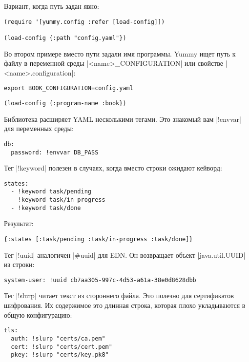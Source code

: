 Вариант, когда путь задан явно:

\begin{verbatim}
(require '[yummy.config :refer [load-config]])

(load-config {:path "config.yaml"})
\end{verbatim}

Во втором примере вместо пути задали имя программы. Yummy ищет путь к файлу в
переменной среды \spverb|<name>_CONFIGURATION| или свойстве \spverb|<name>.configuration|:

\begin{verbatim}
export BOOK_CONFIGURATION=config.yaml
\end{verbatim}

\begin{verbatim}
(load-config {:program-name :book})
\end{verbatim}

Библиотека расширяет YAML несколькими тегами. Это знакомый вам \spverb|!envvar| для
переменных среды:

\begin{verbatim}
db:
  password: !envvar DB_PASS
\end{verbatim}

Тег \spverb|!keyword| полезен в случаях, когда вместо строки ожидают кейворд:

\begin{verbatim}
states:
  - !keyword task/pending
  - !keyword task/in-progress
  - !keyword task/done
\end{verbatim}

Результат:

\begin{verbatim}
{:states [:task/pending :task/in-progress :task/done]}
\end{verbatim}

Тег \spverb|!uuid| аналогичен \spverb|#uuid| для EDN. Он возвращает объект
\spverb|java.util.UUID| из строки:

\begin{verbatim}
system-user: !uuid cb7aa305-997c-4d53-a61a-38e0d8628dbb
\end{verbatim}

Тег \spverb|!slurp| читает текст из стороннего файла. Это полезно для сертификатов
шифрования. Их содержимое это длинная строка, которая плохо укладываются в общую
конфигурацию:

\begin{verbatim}
tls:
  auth: !slurp "certs/ca.pem"
  cert: !slurp "certs/cert.pem"
  pkey: !slurp "certs/key.pk8"
\end{verbatim}

